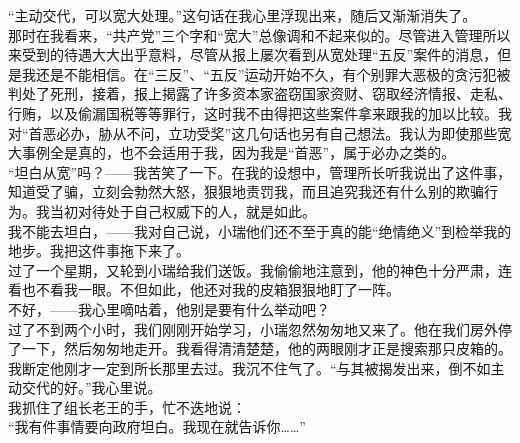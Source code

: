 “主动交代，可以宽大处理。”这句话在我心里浮现出来，随后又渐渐消失了。\\

那时在我看来，“共产党”三个字和“宽大”总像调和不起来似的。尽管进入管理所以来受到的待遇大大出乎意料，尽管从报上屡次看到从宽处理“五反”案件的消息，但是我还是不能相信。在“三反”、“五反”运动开始不久，有个别罪大恶极的贪污犯被判处了死刑，接着，报上揭露了许多资本家盗窃国家资财、窃取经济情报、走私、行贿，以及偷漏国税等等罪行，这时我不由得把这些案件拿来跟我的加以比较。我对“首恶必办，胁从不问，立功受奖”这几句话也另有自己想法。我认为即使那些宽大事例全是真的，也不会适用于我，因为我是“首恶”，属于必办之类的。\\

“坦白从宽”吗？——我苦笑了一下。在我的设想中，管理所长听我说出了这件事，知道受了骗，立刻会勃然大怒，狠狠地责罚我，而且追究我还有什么别的欺骗行为。我当初对待处于自己权威下的人，就是如此。\\

我不能去坦白，——我对自己说，小瑞他们还不至于真的能“绝情绝义”到检举我的地步。我把这件事拖下来了。\\

过了一个星期，又轮到小瑞给我们送饭。我偷偷地注意到，他的神色十分严肃，连看也不看我一眼。不但如此，他还对我的皮箱狠狠地盯了一阵。\\

不好，——我心里嘀咕着，他别是要有什么举动吧？\\

过了不到两个小时，我们刚刚开始学习，小瑞忽然匆匆地又来了。他在我们房外停了一下，然后匆匆地走开。我看得清清楚楚，他的两眼刚才正是搜索那只皮箱的。\\

我断定他刚才一定到所长那里去过。我沉不住气了。“与其被揭发出来，倒不如主动交代的好。”我心里说。\\

我抓住了组长老王的手，忙不迭地说：\\

“我有件事情要向政府坦白。我现在就告诉你……”
